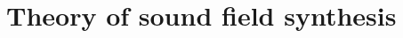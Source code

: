 \documentclass[%
	paper=A4,					%
	twoside=true,				%
	openright,					%
	chapterprefix=true,			%
	11pt,						%
	headings=normal,			%
	bibliography=totoc,			%
	listof=totoc,				%
	titlepage=on,				%
	captions=tableabove,		%
	draft=false,				%
]{scrreprt}
\begin{document}
\sloppy



\pagestyle{empty}				%
\cleardoublepage



\cleardoublepage

\pagestyle{plain}				%
\setcounter{tocdepth}{2}		%
\tableofcontents				%
\cleardoublepage
{}			%
\setcounter{page}{1}			%
\pagestyle{maincontentstyle} 	%

%
%
%
%

%
%
%
%
\chapter{Theory of sound field synthesis}
\label{sec:sound_field_synthesis}

\end{document}
